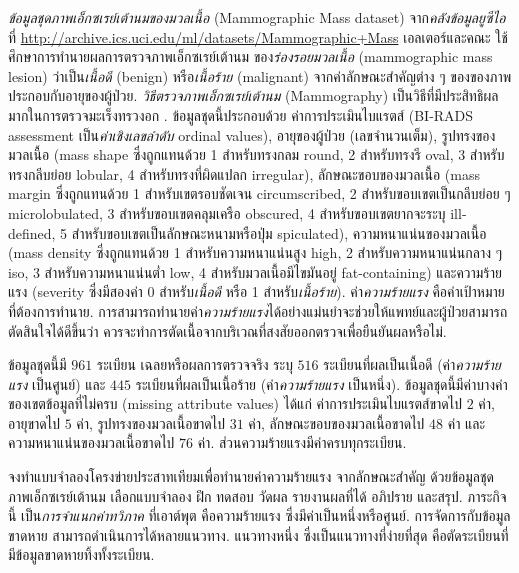 \begin{Exercise}
\label{ex: mammography}

\textit{ข้อมูลชุดภาพเอ็กซเรย์เต้านมของมวลเนื้อ} (Mammographic Mass dataset) 
จาก\textit{คลังข้อมูลยูซีไอ}ที่ \url{http://archive.ics.uci.edu/ml/datasets/Mammographic+Mass} 
เอลเตอร์และคณะ\cite{ElterEtAl2007a}
ใช้ศึกษาการทำนายผลการตรวจภาพเอ็กซเรย์เต้านม
ของ\textit{ร่องรอยมวลเนื้อ} (mammographic mass lesion) ว่าเป็น\textit{เนื้อดี} (benign) หรือ\textit{เนื้อร้าย} (malignant) จากค่าลักษณะสำคัญต่าง ๆ ของของภาพ ประกอบกับอายุของผู้ป่วย.
\textit{วิธีตรวจภาพเอ็กซเรย์เต้านม} (Mammography) เป็นวิธีที่มีประสิทธิผลมากในการตรวจมะเร็งทรวงอก \cite{ElterEtAl2007a}.
ข้อมูลชุดนี้ประกอบด้วย ค่าการประเมินไบแรตส์ (BI-RADS assessment เป็น\textit{ค่าเชิงเลขลำดับ} ordinal values),
อายุของผู้ป่วย (เลขจำนวนเต็ม),
รูปทรงของมวลเนื้อ (mass shape ซึ่งถูกแทนด้วย 
1 สำหรับทรงกลม round, 
2 สำหรับทรงรี oval, 
3 สำหรับทรงกลีบย่อย lobular, 
4 สำหรับทรงที่ผิดแปลก irregular), 
ลักษณะขอบของมวลเนื้อ (mass margin ซึ่งถูกแทนด้วย
1 สำหรับเขตรอบชัดเจน circumscribed, 
2 สำหรับขอบเขตเป็นกลีบย่อย ๆ microlobulated, 
3 สำหรับขอบเขตคลุมเครือ obscured, 
4 สำหรับขอบเขตยากจะระบุ ill-defined, 
5 สำหรับขอบเขตเป็นลักษณะหนามหรือปุ่ม spiculated),
ความหนาแน่นของมวลเนื้อ (mass density ซึ่งถูกแทนด้วย
1 สำหรับความหนาแน่นสูง high, 
2 สำหรับความหนาแน่นกลาง ๆ iso, 
3 สำหรับความหนาแน่นต่ำ low, 
4 สำหรับมวลเนื้อมีไขมันอยู่ fat-containing)
และความร้ายแรง (severity ซึ่งมีสองค่า
0 สำหรับ\textit{เนื้อดี} 
หรือ 1 สำหรับ\textit{เนื้อร้าย}).
ค่า\textit{ความร้ายแรง} คือค่าเป้าหมาย ที่ต้องการทำนาย.
การสามารถทำนายค่า\textit{ความร้ายแรง}ได้อย่างแม่นยำจะช่วยให้แพทย์และผู้ป่วยสามารถตัดสินใจได้ดีขึ้นว่า 
ควรจะทำการตัดเนื้อจากบริเวณที่สงสัยออกตรวจเพื่อยืนยันผลหรือไม่.

ข้อมูลชุดนี้มี $961$ ระเบียน 
เฉลยหรือผลการตรวจจริง ระบุ $516$ ระเบียนที่ผลเป็นเนื้อดี (ค่า\textit{ความร้ายแรง} เป็นศูนย์) และ $445$ ระเบียนที่ผลเป็นเนื้อร้าย (ค่า\textit{ความร้ายแรง} เป็นหนึ่ง).
%
ข้อมูลชุดนี้มีค่าบางค่าของเขตข้อมูลที่ไม่ครบ (missing attribute values) ได้แก่
ค่าการประเมินไบแรตส์ขาดไป $2$ ค่า, 
อายุขาดไป $5$ ค่า, 
รูปทรงของมวลเนื้อขาดไป $31$ ค่า,
ลักษณะขอบของมวลเนื้อขาดไป $48$ ค่า
และความหนาแน่นของมวลเนื้อขาดไป $76$ ค่า.
ส่วนความร้ายแรงมีค่าครบทุกระเบียน.

จงทำแบบจำลองโครงข่ายประสาทเทียมเพื่อทำนายค่าความร้ายแรง
จากลักษณะสำคัญ ด้วยข้อมูลชุดภาพเอ็กซเรย์เต้านม
เลือกแบบจำลอง ฝึก ทดสอบ วัดผล รายงานผลที่ได้ อภิปราย และสรุป.
%
ภาระกิจนี้ เป็น\textit{การจำแนกค่าทวิภาค}
ที่เอาต์พุต คือความร้ายแรง ซึ่งมีค่าเป็นหนึ่งหรือศูนย์.
%
การจัดการกับข้อมูลขาดหาย สามารถดำเนินการได้หลายแนวทาง.
แนวทางหนึ่ง ซึ่งเป็นแนวทางที่ง่ายที่สุด คือตัดระเบียนที่มีข้อมูลขาดหายทิ้งทั้งระเบียน.


\end{Exercise}
